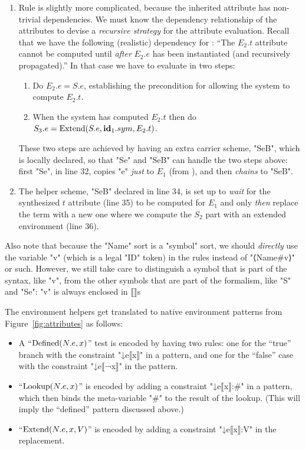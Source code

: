 \documentclass[11pt]{article} %
\begin{document}
\begin{example}
\begin{enumerate}
  \item Rule  is slightly more complicated, because the inherited attribute has
    non-trivial dependencies. We must know the dependency relationship of the attributes to devise a
    \emph{recursive strategy} for the attribute evaluation.  Recall that we have the following
    (realistic) dependency for : ``The $E_2.t$ attribute cannot be computed until
    \emph{after} $E_2.e$ has been instantiated (and recursively propagated).'' In that case we have
    to evaluate  in two steps:
    \begin{enumerate}
    \item Do $E_2.e = S.e$, establishing the precondition for allowing the system to compute $E_2.t$.
    \item When the system has computed $E_2.t$ then do $S_3.e=\operatorname{Extend}(S.e,\textbf{id}_1.sym,E_2.t)$.
    \end{enumerate}
    These two steps are achieved by having an extra carrier scheme, "SeB", which is locally
    declared, so that "Se" and "SeB" can handle the two steps above: first "Se", in line 32, copies
    "e" \emph{just} to $E_1$ (from ), and then \emph{chains} to "SeB".

  \item The helper scheme, "SeB" declared in line 34, is set up to \emph{wait} for the synthesized
    $t$ attribute (line 35) to be computed for $E_1$ and only \emph{then} replace the term with a
    new one where we compute the $S_2$ part with an extended environment (line 36).
    
  \end{enumerate}
  Also note that because the "Name" sort is a "symbol" sort, we should \emph{directly} use the
  variable "v" (which is a legal "ID" token) in the rules instead of "⟨Name#v⟩" or such.  However,
  we still take care to distinguish a symbol that is part of the syntax, like "v", from the other
  symbols that are part of the formalism, like "S" and "Se": "v" is always enclosed in $⟦⟧$s

  The environment helpers get translated to native \HAX environment patterns from
  Figure~\ref{fig:attributes} as follows:
  \begin{itemize}

  \item A ``$\operatorname{Defined}(N.e, x)$'' test is encoded by having two rules: one for the ``true''
    branch with the constraint "↓e{⟦x⟧}" in a pattern, and one for the ``false'' case with the
    constraint "↓e{⟦¬x⟧}" in the pattern.

  \item ``$\operatorname{Lookup}(N.e, x)$'' is encoded by adding a constraint "↓e{⟦x⟧:#}" in a pattern, which
    then binds the meta-variable "#" to the result of the lookup. (This will imply the ``defined''
    pattern discussed above.)

  \item ``$\operatorname{Extend}(N.e, x, V)$'' is encoded by adding a constraint "↓e{⟦x⟧:V}" in the
    replacement.

  \end{itemize}
\end{example}
\end{document}

